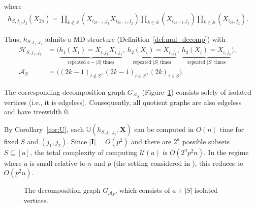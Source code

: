 \documentclass[sn-mathphys, natbib=false]{sn-jnl}
\theoremstyle{plain}
\theoremstyle{definition}
\newcommand{\ustat}{\mathbb{U}}
\newcommand{\graphform}[1]{G_{#1}}
\def\calA{\mathcal{A}}
\def\calH{\mathcal{H}}
\begin{document}
\begin{bibunit}[agsm]
where
\begin{align*}
    h_{S,j_1,j_2}(\bar{X}_{2a}) 
    = \prod_{k \notin S} (X_{i_{2k-1},j_1} X_{i_{2k-1},j_2}) 
      \prod_{k \in S} (X_{i_{2k-1},j_1}) 
      \prod_{k \in S} (X_{i_{2k},j_2}).
\end{align*}

Thus, $h_{S,j_1,j_2}$ admits a MD structure (Definition~\ref{def:mul_decomp}) with 
\begin{align*}
    \calH_{S,j_1,j_2} &= \bigl( 
        \underbrace{h_1(X_i) = X_{i,j_1} X_{i,j_2}}_{\text{repeated } a - |S| \text{ times}},\ 
        \underbrace{h_2(X_i) = X_{i,j_1}}_{\text{repeated } |S| \text{ times}},\ 
        \underbrace{h_3(X_i) = X_{i,j_2}}_{\text{repeated } |S| \text{ times}}
    \bigr), \\
        \calA_S & = \bigl( (2k-1)_{i \notin S}, (2k-1)_{i \in S} , (2k)_{i \in S} \bigr).
\end{align*}

The corresponding decomposition graph $\graphform{\calA_S}$ (Figure~\ref{fig:decomp_graph_AS}) consists solely of isolated vertices (i.e., it is edgeless). Consequently, all quotient graphs are also edgeless and have treewidth 0.

By Corollary~\ref{cor:U}, each $\ustat(h_{S,j_1,j_2}, \bm{X})$ can be computed in $O(n)$ time for fixed $S$ and $(j_1,j_2)$. Since $|\mathbf{I}| = O(p^2)$ and there are $2^a$ possible subsets $S \subseteq [a]$, the total complexity of computing $\mathcal{U}(a)$ is $O(2^a p^2 n)$. In the regime where $a$ is small relative to $n$ and $p$ (the setting considered in \cite{he2021asymptotically}), this reduces to $O(p^2 n)$.

\begin{figure}[h!]
    \centering
    \caption{The decomposition graph $\graphform{\calA_{S}}$, which consists of $a + |S|$ isolated vertices.}
    \label{fig:decomp_graph_AS}
\end{figure}


\end{bibunit}
\end{document}
